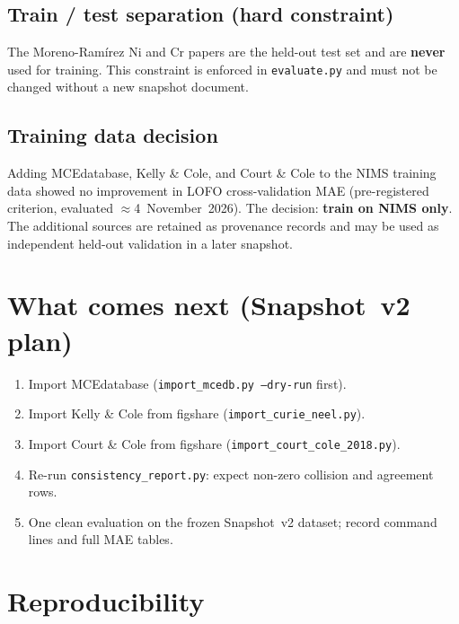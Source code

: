 \documentclass[11pt,a4paper]{article}
\begin{document}
\subsection*{Train / test separation (hard constraint)}

The Moreno-Ram\'{i}rez Ni and Cr papers are the held-out test set and
are \textbf{never} used for training.  This constraint is enforced in
\texttt{evaluate.py} and must not be changed without a new snapshot
document.

\subsection*{Training data decision}

Adding MCEdatabase, Kelly \& Cole, and Court \& Cole to the NIMS training
data showed no improvement in LOFO cross-validation MAE (pre-registered
criterion, evaluated $\approx$4~November~2026).  The decision: \textbf{train
on NIMS only}.  The additional sources are retained as provenance records
and may be used as independent held-out validation in a later snapshot.

\section{What comes next (Snapshot~v2 plan)}

\begin{enumerate}
  \item Import MCEdatabase (\texttt{import\_mcedb.py --dry-run} first).
  \item Import Kelly \& Cole from figshare (\texttt{import\_curie\_neel.py}).
  \item Import Court \& Cole from figshare (\texttt{import\_court\_cole\_2018.py}).
  \item Re-run \texttt{consistency\_report.py}: expect non-zero collision
        and agreement rows.
  \item One clean evaluation on the frozen Snapshot~v2 dataset;
        record command lines and full MAE tables.
\end{enumerate}


\newpage

\section*{Reproducibility}
\end{document}
